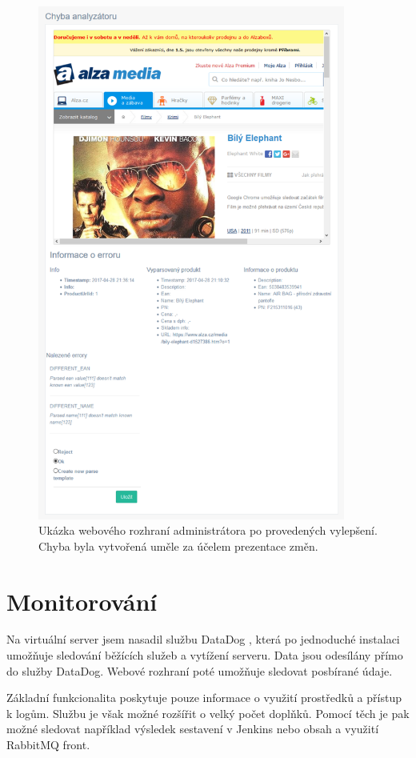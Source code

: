 \documentclass[thesis=B,czech]{FITthesis}[2012/06/26]
\begin{document}
\begin{figure}[h]\centering
 	\includegraphics[width=0.9\textwidth]{resources/analyser-err}
	\caption[Webové rozhraní pro vyřešení chyby analyzátoru po provedení vylepšení]{Ukázka webového rozhraní administrátora po provedených vylepšení. 
	Chyba byla vytvořená uměle za účelem prezentace změn.}\label{fig:analyser-error}
\end{figure}

\section{Monitorování}
Na virtuální server jsem nasadil službu DataDog \cite{dataDog}, která po jednoduché instalaci umožňuje sledování běžících služeb
a vytížení serveru. Data jsou odesílány přímo do služby DataDog. Webové rozhraní poté umožňuje sledovat posbírané údaje.
\par
Základní funkcionalita poskytuje pouze informace o využití prostředků a přístup k logům. Službu je však možné rozšířit o velký počet doplňků. Pomocí těch je pak možné sledovat například výsledek sestavení v Jenkins nebo obsah a využití RabbitMQ front.
\end{document}
